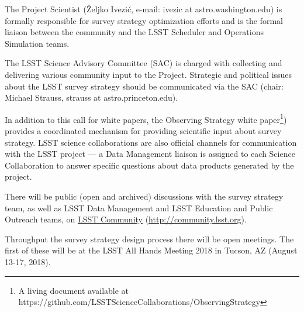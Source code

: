 \documentclass[DM,lsstdraft,toc,usenatbib]{lsstdoc}
\begin{document}
The Project Scientist (\v{Z}eljko Ivezi\'{c}, e-mail: ivezic at astro.washington.edu) is formally responsible for survey strategy optimization efforts and is the formal liaison between the community and the LSST Scheduler and Operations Simulation teams.

The LSST Science Advisory Committee (SAC) is charged with collecting and delivering various community input to the Project. Strategic and political issues about the LSST survey strategy should be communicated via the SAC (chair: Michael Strauss, strauss at astro.princeton.edu).

In addition to this call for white papers, the Observing Strategy white paper\footnote{A living document available at https://github.com/LSSTScienceCollaborations/ObservingStrategy}) provides a coordinated mechanism for providing scientific input about survey strategy. LSST science collaborations are also official channels for communication with the LSST project --- a Data Management liaison is assigned to each Science Collaboration to answer specific questions about data products generated by the project.

There will be public (open and archived) discussions with the survey strategy team, as well as LSST Data Management and LSST Education and Public Outreach teams, on \href{http://community.lsst.org}{LSST Community} (\url{http://community.lsst.org}). 

Throughput the survey strategy design process there will be open meetings. The first of these will be at the LSST All Hands Meeting 2018 in Tucson, AZ (August 13-17, 2018). 
\end{document}
